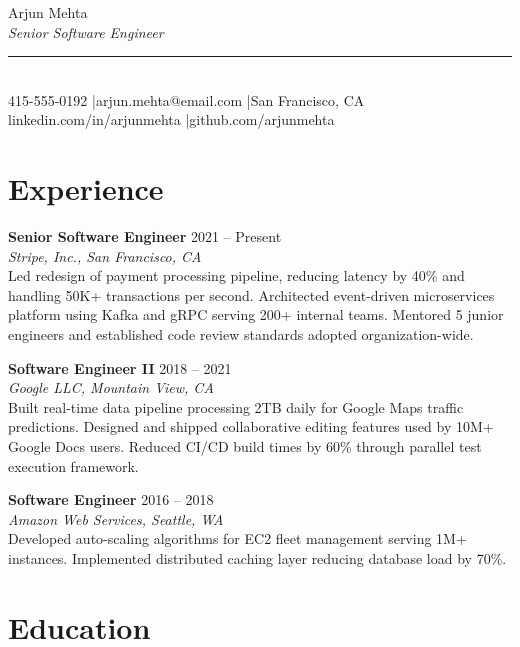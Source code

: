 \documentclass[11pt,letterpaper]{article}
\begin{document}
\begin{center}
\vspace*{-10pt}
{\fontsize{26}{32}\selectfont Arjun Mehta}\\[8pt]
{\normalsize\itshape Senior Software Engineer}\\[12pt]
\textcolor{darkgold}{\rule{4in}{0.5pt}}\\[8pt]
{\small 415-555-0192 \quad\textcolor{darkgold}{|}\quad arjun.mehta@email.com \quad\textcolor{darkgold}{|}\quad San Francisco, CA}\\[3pt]
{\small linkedin.com/in/arjunmehta \quad\textcolor{darkgold}{|}\quad github.com/arjunmehta}
\end{center}

\section{Experience}

\noindent\textbf{Senior Software Engineer} \hfill 2021 -- Present\\
\textit{Stripe, Inc., San Francisco, CA}\\[4pt]
Led redesign of payment processing pipeline, reducing latency by 40\% and handling 50K+ transactions per second. Architected event-driven microservices platform using Kafka and gRPC serving 200+ internal teams. Mentored 5 junior engineers and established code review standards adopted organization-wide.

\vspace{10pt}
\noindent\textbf{Software Engineer II} \hfill 2018 -- 2021\\
\textit{Google LLC, Mountain View, CA}\\[4pt]
Built real-time data pipeline processing 2TB daily for Google Maps traffic predictions. Designed and shipped collaborative editing features used by 10M+ Google Docs users. Reduced CI/CD build times by 60\% through parallel test execution framework.

\vspace{10pt}
\noindent\textbf{Software Engineer} \hfill 2016 -- 2018\\
\textit{Amazon Web Services, Seattle, WA}\\[4pt]
Developed auto-scaling algorithms for EC2 fleet management serving 1M+ instances. Implemented distributed caching layer reducing database load by 70\%.

\section{Education}
\end{document}
